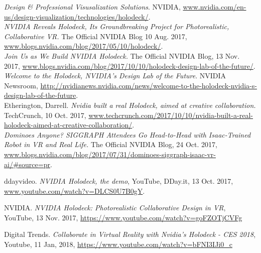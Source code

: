 \documentclass[11pt]{article}
\begin{document}
\newpage
\begin{thebibliography}{9}
\textit{Design \& Professional Visusalization Solutions}. NVIDIA, \url{www.nvidia.com/en-us/design-visualization/technologies/holodeck/}.\\
 
\textit{NVIDIA Reveals Holodeck, Its Groundbreaking Project for Photorealistic, Collaborative VR.} 
The Official NVIDIA Blog 10 Aug. 2017, \url{www.blogs.nvidia.com/blog/2017/05/10/holodeck/}.\\

\textit{Join Us as We Build NVIDIA Holodeck.} The Official NVIDIA Blog, 13 Nov. 2017, \url{www.blogs.nvidia.com/blog/2017/10/10/holodeck-design-lab-of-the-future/}.\\
 
\textit{Welcome to the Holodeck, NVIDIA's Design Lab of the Future}. NVIDIA Newsroom, \url{http://nvidianews.nvidia.com/news/welcome-to-the-holodeck-nvidia-s-design-lab-of-the-future}.\\

Etherington, Darrell. \textit{Nvidia built a real Holodeck, aimed at creative collaboration.} TechCrunch, 10 Oct. 2017, \url{www.techcrunch.com/2017/10/10/nvidia-built-a-real-holodeck-aimed-at-creative-collaboration/}.\\

\textit{Dominoes Anyone? SIGGRAPH Attendees Go Head-to-Head with Isaac-Trained Robot in VR and Real Life.} The Official NVIDIA Blog, 24 Oct. 2017, \url{www.blogs.nvidia.com/blog/2017/07/31/dominoes-siggraph-isaac-vr-ai/#source=pr}.

ddayvideo. \textit{NVIDIA Holodeck, the demo}, YouTube, DDay.it, 13 Oct. 2017, \url{www.youtube.com/watch?v=DLCS0U7B0gY}.

NVIDIA. \textit{NVIDIA Holodeck: Photorealistic Collaborative Design in VR}, YouTube, 13 Nov. 2017, \url{https://www.youtube.com/watch?v=goFZOTjCVFg}

Digital Trends. \textit{Collaborate in Virtual Reality with Nvidia's Holodeck - CES 2018}, Youtube, 11 Jan, 2018, \url{https://www.youtube.com/watch?v=bFNI3IJi0_c}

\end{thebibliography}
\end{document}
